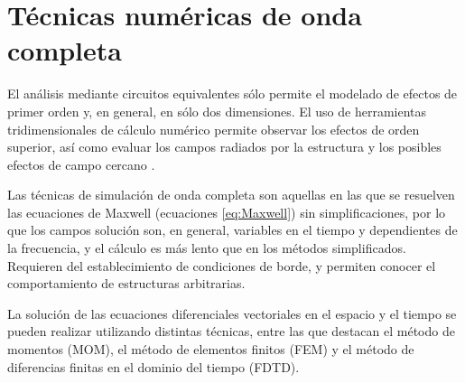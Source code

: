 \section{Técnicas numéricas de onda completa}
\label{sec_estructuras_periodicas}

El análisis mediante circuitos equivalentes sólo permite el modelado de efectos de primer orden y, en general, en sólo dos dimensiones. El uso de herramientas tridimensionales de cálculo numérico permite observar los efectos de orden superior, así como evaluar los campos radiados por la estructura y los posibles efectos de campo cercano \cite{Mohajer:SupressionBand}.

Las técnicas de simulación de onda completa son aquellas en las que se resuelven las ecuaciones de Maxwell (ecuaciones \ref{eq:Maxwell}) sin simplificaciones, por lo que los campos solución son, en general, variables en el tiempo y dependientes de la frecuencia, y el cálculo es más lento que en los métodos simplificados. Requieren del establecimiento de condiciones de borde, y permiten conocer el comportamiento de estructuras arbitrarias.

La solución de las ecuaciones diferenciales vectoriales en el espacio y el tiempo se pueden realizar utilizando distintas técnicas, entre las que destacan el método de momentos (MOM), el método de elementos finitos (FEM) y el método de diferencias finitas en el dominio del tiempo (FDTD).

